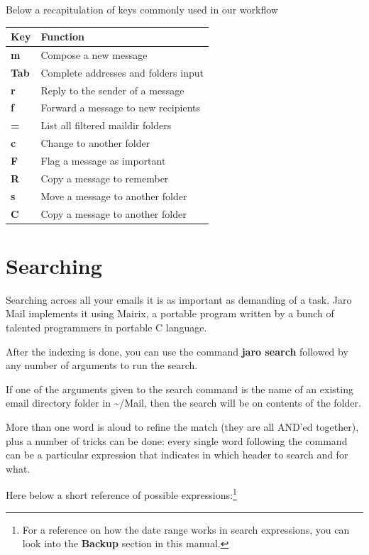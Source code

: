 \documentclass[a4,onecolumn,portrait]{article}
\begin{document}
Below a recapitulation of keys commonly used in our workflow

\begin{center}
\begin{tabular}{ll}
Key & Function\\
\hline
\textbf{m} & Compose a new message\\
\textbf{Tab} & Complete addresses and folders input\\
\textbf{r} & Reply to the sender of a message\\
\textbf{f} & Forward a message to new recipients\\
\textbf{=} & List all filtered maildir folders\\
\textbf{c} & Change to another folder\\
\textbf{F} & Flag a message as important\\
\textbf{R} & Copy a message to remember\\
\textbf{s} & Move a message to another folder\\
\textbf{C} & Copy a message to another folder\\
\end{tabular}
\end{center}
\section{Searching}
\label{sec-7}

Searching across all your emails it is as important as demanding of
a task. Jaro Mail implements it using Mairix, a portable program
written by a bunch of talented programmers in portable C language.

After the indexing is done, you can use the command \textbf{jaro search}
followed by any number of arguments to run the search.

If one of the arguments given to the search command is the name of
an existing email directory folder in \textasciitilde{}/Mail, then the search will
be on contents of the folder.

More than one word is aloud to refine the match (they are all AND'ed
together), plus a number of tricks can be done: every single word
following the command can be a particular expression that indicates
in which header to search and for what.

Here below a short reference of possible expressions:\footnote{For a reference on how the date range works in search expressions, you can look into the \textbf{Backup} section in this manual.}
\end{document}
